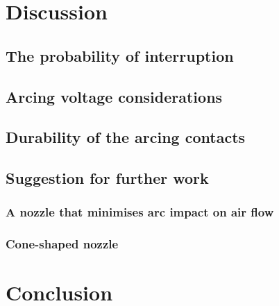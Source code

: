 \documentclass[10pt,b5paper,twoside]{article}
\begin{document}
\cleardoublepage

\section{Discussion}
\subsection{The probability of interruption} 


\subsection{Arcing voltage considerations}
 

\subsection{Durability of the arcing contacts} \label{fig:durability}


\newpage
\subsection{Suggestion for further work}
\subsubsection{A nozzle that minimises arc impact on air flow}


\subsubsection{Cone-shaped nozzle}


\cleardoublepage

\section{Conclusion}
\end{document}
